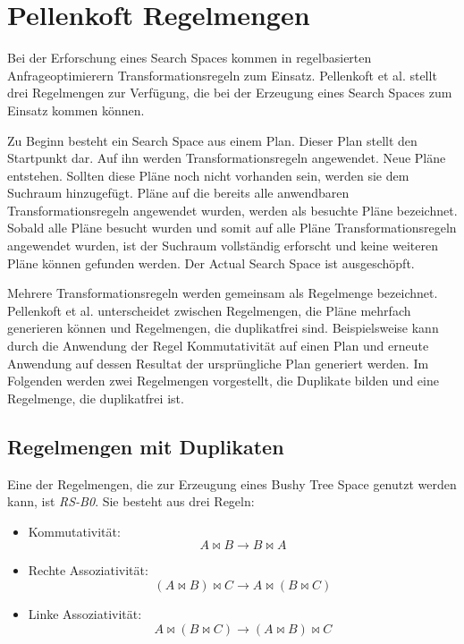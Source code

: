 \section{Pellenkoft Regelmengen}
\label{sec:pellenkoftRulesets}
Bei der Erforschung eines Search Spaces kommen in regelbasierten Anfrageoptimierern Transformationsregeln zum Einsatz. Pellenkoft et al. \cite{pellenkoft1997duplicate} \cite{manegold2000multi} \cite{pellenkoft1997complexity} stellt drei Regelmengen zur Verfügung, die bei der Erzeugung eines Search Spaces zum Einsatz kommen können.


Zu Beginn besteht ein Search Space aus einem Plan. Dieser Plan stellt den Startpunkt dar. Auf ihn werden Transformationsregeln angewendet. Neue Pläne entstehen. Sollten diese Pläne noch nicht vorhanden sein, werden sie dem Suchraum hinzugefügt. Pläne auf die bereits alle anwendbaren Transformationsregeln angewendet wurden, werden als besuchte Pläne bezeichnet. Sobald alle Pläne besucht wurden und somit auf alle Pläne Transformationsregeln angewendet wurden, ist der Suchraum vollständig erforscht und keine weiteren Pläne können gefunden werden. Der Actual Search Space ist ausgeschöpft.

Mehrere Transformationsregeln werden gemeinsam als Regelmenge bezeichnet. Pellenkoft et al. unterscheidet zwischen Regelmengen, die Pläne mehrfach generieren können und Regelmengen, die duplikatfrei sind. Beispielsweise kann durch die Anwendung der Regel Kommutativität auf einen Plan und erneute Anwendung auf dessen Resultat  der ursprüngliche Plan generiert werden. Im Folgenden werden zwei Regelmengen vorgestellt, die Duplikate bilden und eine Regelmenge, die duplikatfrei ist.


\subsection{Regelmengen mit Duplikaten}

Eine der Regelmengen, die zur Erzeugung eines Bushy Tree Space genutzt werden kann, ist \textit{RS-B0}. Sie besteht aus drei Regeln:

\begin{itemize}
\item Kommutativität: $$ A \Join B \to B \Join A$$
\item Rechte Assoziativität: $$(A \Join B) \Join C \to A \Join (B \Join C) $$
\item Linke Assoziativität: $$A \Join (B \Join C) \to (A \Join B) \Join C$$
\end{itemize}


